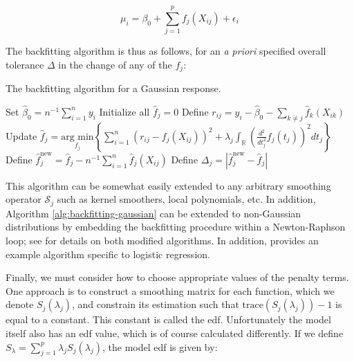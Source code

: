 \documentclass{report}
\begin{document}
\begin{equation}\label{eq:glm-gam-model-form-gaussian}
    \mu_i = \beta_0 + \sum_{j=1}^p f_j(X_{ij}) + \epsilon_i
\end{equation}

The backfitting algorithm is thus as follows, for an \textit{a priori} specified overall tolerance $\Delta$ in the change of any of the $f_j$:

\begin{algorithm}[h!]
    \caption{The backfitting algorithm for a Gaussian response.}\label{alg:backfitting-gaussian}
    \begin{algorithmic}[1]
        \STATE Set $\hat{\beta}_0 = n^{-1} \sum_{i=1}^n y_i$
        \STATE Initialize all $\hat{f}_j = 0$
                \STATE Define $r_{ij} = y_i - \hat{\beta}_0 - \sum_{k \neq j} \hat{f}_k(X_{ik})$
                \STATE Update $\hat{f}_j = \underset{f_j}{\text{arg min}} \left\{\sum_{i=1}^n \left(r_{ij} - f_j(X_{ij})\right)^2 + \lambda_j \int_{\mathbb{R}} \left(\frac{d^2}{dt_j^2} f_j(t_j)\right)^2 dt_j\right\}$
                \STATE Define $\hat{f}_j^{\text{new}} = \hat{f}_j - n^{-1} \sum_{i=1}^n \hat{f}_j(X_{ij})$
                \STATE Define $\Delta_j = \left|\hat{f}_j^{\text{new}} - \hat{f}_j\right|$
            \ENDFOR
        \ENDWHILE
    \end{algorithmic}
\end{algorithm}

This algorithm can be somewhat easily extended to any arbitrary smoothing operator $\mathcal{S}_j$ such as kernel smoothers, local polynomials, etc. In addition, Algorithm \ref{alg:backfitting-gaussian} can be extended to non-Gaussian distributions by embedding the backfitting procedure within a Newton-Raphson loop; see \cite[Lecture~14]{molstad_sta_2022} for details on both modified algorithms. In addition, \cite[Chapter~9.1.2]{hastie_elements_2009} provides an example algorithm specific to logistic regression.

Finally, we must consider how to choose appropriate values of the penalty terms. One approach is to construct a smoothing matrix for each function, which we denote $S_j(\lambda_j)$, and constrain its estimation such that $\text{trace}(S_j(\lambda_j)) - 1$ is equal to a constant. This constant is called the \gls{edf}. Unfortunately the model itself also has an \gls{edf} value, which is of course calculated differently. If we define $S_\lambda = \sum_{j=1}^p \lambda_jS_j(\lambda_j)$, the model \gls{edf} is given by:
\end{document}
